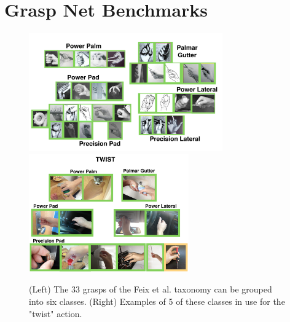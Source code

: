 \section{Grasp Net Benchmarks}   
    \label{secGraspNet}
 
\begin{figure}
\begin{center}
{\includegraphics[height=2in]{./figs/sixGraspTypes.png}}
{\includegraphics[height=2in]{./figs/twistGraspTypes.png}}
\end{center}
\caption[]{(Left) The 33 grasps of the Feix et al. taxonomy \cite{feixgrasp} can be grouped into six classes. (Right) Examples of 5 of these classes in use for the "twist" action.}
\label{GraspNet}
\end{figure}

